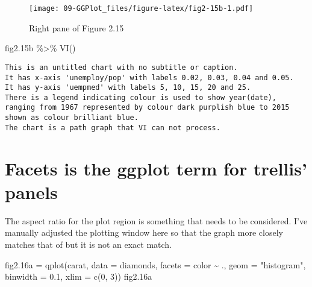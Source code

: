 \documentclass[
]{book}
\newenvironment{Shaded}{\begin{snugshade}}{\end{snugshade}}
\newcommand{\AttributeTok}[1]{\textcolor[rgb]{0.77,0.63,0.00}{#1}}
\newcommand{\DecValTok}[1]{\textcolor[rgb]{0.00,0.00,0.81}{#1}}
\newcommand{\FloatTok}[1]{\textcolor[rgb]{0.00,0.00,0.81}{#1}}
\newcommand{\FunctionTok}[1]{\textcolor[rgb]{0.00,0.00,0.00}{#1}}
\newcommand{\NormalTok}[1]{#1}
\newcommand{\OtherTok}[1]{\textcolor[rgb]{0.56,0.35,0.01}{#1}}
\newcommand{\SpecialCharTok}[1]{\textcolor[rgb]{0.00,0.00,0.00}{#1}}
\newcommand{\StringTok}[1]{\textcolor[rgb]{0.31,0.60,0.02}{#1}}
\begin{document}
\begin{figure}
\centering
\texttt{[image: 09-GGPlot\_files/figure-latex/fig2-15b-1.pdf]}
\caption{\label{fig:fig2-15b}Right pane of Figure 2.15}
\end{figure}

\begin{Shaded}
\begin{Highlighting}[]
\NormalTok{fig2}\FloatTok{.15}\NormalTok{b }\SpecialCharTok{\%\textgreater{}\%} \FunctionTok{VI}\NormalTok{()   }
\end{Highlighting}
\end{Shaded}

\begin{verbatim}
This is an untitled chart with no subtitle or caption.
It has x-axis 'unemploy/pop' with labels 0.02, 0.03, 0.04 and 0.05.
It has y-axis 'uempmed' with labels 5, 10, 15, 20 and 25.
There is a legend indicating colour is used to show year(date), ranging from 1967 represented by colour dark purplish blue to 2015 shown as colour brilliant blue.
The chart is a path graph that VI can not process.
\end{verbatim}

\hypertarget{facets-is-the-ggplot-term-for-trellis-panels}{%
\section{Facets is the ggplot term for trellis' panels}\label{facets-is-the-ggplot-term-for-trellis-panels}}

The aspect ratio for the plot region is something that needs to be considered. I've manually adjusted the plotting window here so that the graph more closely matches that of \citet{Wickham2009ggplot2} but it is not an exact match.

\begin{Shaded}
\begin{Highlighting}[]
\NormalTok{fig2}\FloatTok{.16}\NormalTok{a }\OtherTok{=} \FunctionTok{qplot}\NormalTok{(carat, }\AttributeTok{data =}\NormalTok{ diamonds, }\AttributeTok{facets =}\NormalTok{ color }\SpecialCharTok{\textasciitilde{}}\NormalTok{ ., }\AttributeTok{geom =} \StringTok{"histogram"}\NormalTok{, }\AttributeTok{binwidth =} \FloatTok{0.1}\NormalTok{, }
\AttributeTok{xlim =} \FunctionTok{c}\NormalTok{(}\DecValTok{0}\NormalTok{, }\DecValTok{3}\NormalTok{))    }
\NormalTok{fig2}\FloatTok{.16}\NormalTok{a}
\end{Highlighting}
\end{Shaded}
\end{document}
